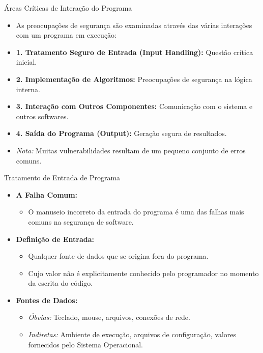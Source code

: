 \begin{frame}{Áreas Críticas de Interação do Programa}
    \begin{itemize}
        \item As preocupações de segurança são examinadas através das várias interações com um programa em execução:

        \item \textbf{1. Tratamento Seguro de Entrada (Input Handling):} Questão crítica inicial.
        \item \textbf{2. Implementação de Algoritmos:} Preocupações de segurança na lógica interna.
        \item \textbf{3. Interação com Outros Componentes:} Comunicação com o sistema e outros softwares.
        \item \textbf{4. Saída do Programa (Output):} Geração segura de resultados.

        \item \textit{Nota:} Muitas vulnerabilidades resultam de um pequeno conjunto de erros comuns.
    \end{itemize}
\end{frame}

\begin{frame}{Tratamento de Entrada de Programa}
    \begin{itemize}
        \item \textbf{A Falha Comum:}
              \begin{itemize}
                  \item O manuseio incorreto da entrada do programa é uma das falhas mais comuns na segurança de software.
              \end{itemize}

        \item \textbf{Definição de Entrada:}
              \begin{itemize}
                  \item Qualquer fonte de dados que se origina fora do programa.
                  \item Cujo valor não é explicitamente conhecido pelo programador no momento da escrita do código.
              \end{itemize}

        \item \textbf{Fontes de Dados:}
              \begin{itemize}
                  \item \textit{Óbvias:} Teclado, mouse, arquivos, conexões de rede.
                  \item \textit{Indiretas:} Ambiente de execução, arquivos de configuração, valores fornecidos pelo Sistema Operacional.
              \end{itemize}
    \end{itemize}
\end{frame}

